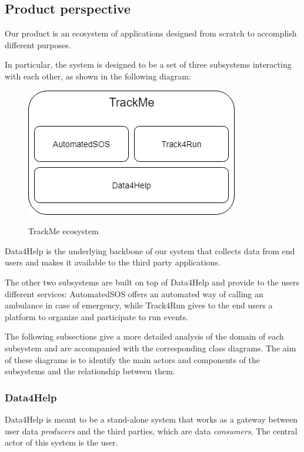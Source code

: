 \subsection{Product perspective}
Our product is an ecosystem of applications designed from scratch to accomplish different purposes.

In particular, the system is designed to be a set of three subsystems interacting with each other, as shown in the following diagram:

\FloatBarrier
\begin{figure}[!ht]
	\centering
	\includegraphics[scale = 0.70]{Images/general_structure.png}\\[1.0 cm]
	\caption{TrackMe ecosystem}
\end{figure}
\FloatBarrier

Data4Help is the underlying backbone of our system that collects data from end users and makes it available to the third party applications. 

The other two subsystems are built on top of Data4Help and provide to the users different services: AutomatedSOS offers an automated way of calling an ambulance in case of emergency, while Track4Run gives to the end users a platform to organize and participate to run events.

The following subsections give a more detailed analysis of the domain of each subsystem and are accompanied with the corresponding class diagrams. The aim of these diagrams is to identify the main actors and components of the subsystems and the relationship between them.

\newpage

\subsubsection{Data4Help}
Data4Help is meant to be a stand-alone system that works as a gateway between user data \textit{producers} and the third parties, which are data \textit{consumers}. The central actor of this system is the user.

